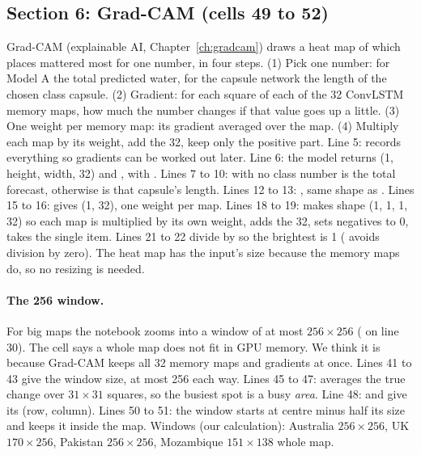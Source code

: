 \subsection{Section 6: Grad-CAM (cells 49 to 52)}
Grad-CAM (explainable AI, Chapter~\ref{ch:gradcam}) draws a heat map of which places mattered most for one number, in four steps. (1) Pick one number: for Model A the total predicted water, for the capsule network the length of the chosen class capsule. (2) Gradient: for each square of each of the 32 ConvLSTM memory maps, how much the number changes if that value goes up a little. (3) One weight per memory map: its gradient averaged over the map. (4) Multiply each map by its weight, add the 32, keep only the positive part.
Line 5:  records everything so gradients can be worked out later. Line 6: the model returns  (1, height, width, 32) and , with . Lines 7 to 10: with no class number  is the total forecast, otherwise  is that capsule's length.
Lines 12 to 13: , same shape as . Lines 15 to 16:  gives (1, 32), one weight per map. Lines 18 to 19:  makes shape (1, 1, 1, 32) so each map is multiplied by its own weight,  adds the 32,  sets negatives to 0,  takes the single item. Lines 21 to 22 divide by  so the brightest is 1 ( avoids division by zero). The heat map has the input's size because the memory maps do, so no resizing is needed.

\paragraph{The 256 window.}
For big maps the notebook zooms into a window of at most $256\times256$ ( on line 30). The cell says a whole map does not fit in GPU memory. We think it is because Grad-CAM keeps all 32 memory maps and gradients at once. Lines 41 to 43 give the window size, at most 256 each way. Lines 45 to 47:  averages the true change over $31\times31$ squares, so the busiest spot is a busy \emph{area}. Line 48:  and  give its (row, column). Lines 50 to 51: the window starts at centre minus half its size and  keeps it inside the map. Windows (our calculation): Australia $256\times256$, UK $170\times256$, Pakistan $256\times256$, Mozambique $151\times138$ whole map.

